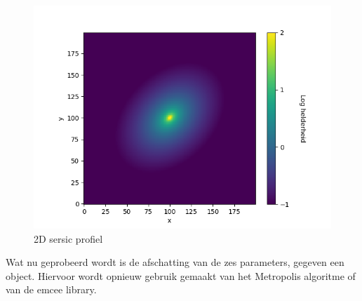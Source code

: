 \begin{figure}
    \centering
    \includegraphics[width=0.95\linewidth]{Figures/figuur_2D_zonder_package_1_25_8_0.3_0.7853981633974483.png}
    \caption{2D sersic profiel}
    \label{fig: 2D_sersic}
\end{figure}
Wat nu geprobeerd wordt is de afschatting van de zes parameters, gegeven een object. Hiervoor wordt opnieuw gebruik gemaakt van het Metropolis algoritme of van de emcee library. 
